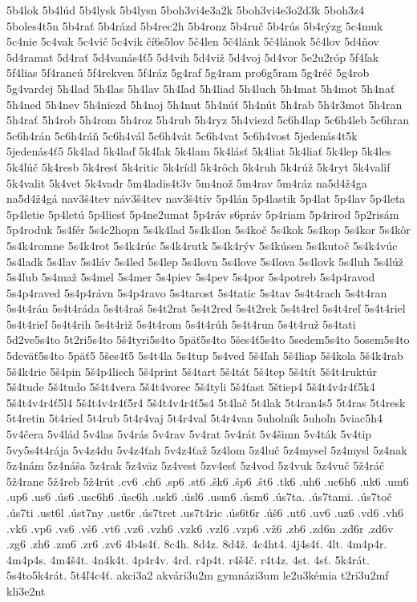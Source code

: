 {5b4lok
5b4lúd
5b4lysk
5b4lysn
5boh3vi4e3a2k
5boh3vi4e3o2d3k
5boh3z4
5boles4t5n
5b4rať
5b4rázd
5b4rec2h
5b4ronz
5b4ruč
5b4rús
5b4rýzg
5c4muk
5c4nie
5c4vak
5c4vič
5c4vik
čí6s5lov
5č4len
5č4lánk
5č4lánok
5č4lov
5d4ňov
5d4ramat
5d4rať
5d4vanás4ť5
5d4vih
5d4viž
5d4voj
5d4vor
5e2u2róp
5f4ľak
5f4lias
5f4rancú
5f4rekven
5f4ráz
5g4raf
5g4ram
pro6g5ram
5g4réč
5g4rob
5g4vardej
5h4lad
5h4las
5h4lav
5h4ľad
5h4liad
5h4luch
5h4mat
5h4mot
5h4nať
5h4ned
5h4nev
5h4niezd
5h4noj
5h4nut
5h4núť
5h4nút
5h4rab
5h4r3mot
5h4ran
5h4rať
5h4rob
5h4rom
5h4roz
5h4rub
5h4ryz
5h4viezd
5c6h4lap
5c6h4leb
5c6hran
5c6h4rán
5c6h4ráň
5c6h4vál
5c6h4vát
5c6h4vat
5c6h4vost
5jedenás4t5k
5jedenás4ť5
5k4lad
5k4laď
5k4ľak
5k4lam
5k4lásť
5k4liat
5k4liať
5k4lep
5k4les
5k4ľúč
5k4resb
5k4resť
5k4ritic
5k4rídl
5k4rôch
5k4ruh
5k4rúž
5k4ryt
5k4valif
5k4valit
5k4vet
5k4vadr
5m4ladis4t3v
5m4nož
5m4rav
5m4ráz
na5d4ž4ga
na5d4ž4gá
nav3š4tev
náv3š4tev
nav3š4tív
5p4lán
5p4lastik
5p4lat
5p4lav
5p4leta
5p4letie
5p4letú
5p4liesť
5p4ne2umat
5p4ráv
s6práv
5p4riam
5p4rirod
5p2risám
5p4roduk
5s4fér
5s4c2hopn
5s4k4lad
5s4k4lon
5s4koč
5s4kok
5s4kop
5s4kor
5s4kôr
5s4k4romne
5s4k4rot
5s4k4rúc
5s4k4rutk
5s4k4rýv
5s4kúsen
5s4kutoč
5s4k4vúc
5s4ladk
5s4lav
5s4láv
5s4led
5s4lep
5s4lovn
5s4love
5s4lova
5s4lovk
5s4luh
5s4lúž
5s4ľub
5s4maž
5s4mel
5s4mer
5s4piev
5s4pev
5s4por
5s4potreb
5s4p4ravod
5s4p4raved
5s4p4rávn
5s4p4ravo
5s4tarost
5s4tatic
5s4tav
5s4t4rach
5s4t4ran
5s4t4rán
5s4t4ráda
5s4t4raš
5s4t2rat
5s4t2red
5s4t2rek
5s4t4rel
5s4t4reľ
5s4t4riel
5s4t4rieľ
5s4t4rih
5s4t4riž
5s4t4rom
5s4t4rúh
5s4t4run
5s4t4ruž
5s4tati
5d2ve5s4to
5t2ri5s4to
5š4tyri5s4to
5päť5s4to
5šes4ť5s4to
5sedem5s4to
5osem5s4to
5deväť5s4to
5päť5
5šes4ť5
5s4t4la
5s4tup
5s4ved
5š4ľah
5š4liap
5š4kola
5š4k4rab
5š4k4rie
5š4pin
5š4p4liech
5š4print
5š4tart
5š4tát
5š4tep
5š4tít
5š4t4ruktúr
5š4tude
5š4tudo
5š4t4vera
5š4t4vorec
5š4tyli
5š4ťast
5štiep4
5š4t4v4r4ť5k4
5š4t4v4r4ť5l4
5š4t4v4r4ť5r4
5š4t4v4r4ť5s4
5t4lač
5t4lak
5t4ran4s5
5t4ras
5t4resk
5t4retin
5t4ried
5t4rub
5t4r4vaj
5t4r4val
5t4r4van
5uholník
5uhoľn
5viac5h4
5v4čera
5v4lád
5v4las
5v4rás
5v4rav
5v4rat
5v4rát
5v4šimn
5v4ták
5v4tip
5vy5s4t4rája
5v4z4du
5v4z4ťah
5v4z4ťaž
5z4lom
5z4luč
5z4mysel
5z4mysl
5z4nak
5z4nám
5z4náša
5z4rak
5z4väz
5z4vest
5zv4esť
5z4vod
5z4vuk
5z4vuč
5ž4ráč
5ž4rane
5ž4reb
5ž4rút
.cv6
.ch6
.sp6
.st6
.šk6
.šp6
.št6
.tk6
.uh6
.uc6h6
.uk6
.um6
.up6
.us6
.ús6
.usc6h6
.úsc6h
.usk6
.úsl6
.usm6
.úsm6
.ús7ta.
.ús7tami.
.ús7toč
.ús7ti
.ust6l
.úst7ny
.ust6r
.ús7tret
.us7t4ric
.ús6t6r
.úš6
.ut6
.uv6
.uz6
.vd6
.vh6
.vk6
.vp6
.vs6
.vš6
.vt6
.vz6
.vzh6
.vzk6
.vzl6
.vzp6
.vž6
.zb6
.zd6n
.zd6r
.zd6v
.zg6
.zh6
.zm6
.zr6
.zv6
4b4s4ť.
8c4h.
8d4z.
8d4ž.
4c4ht4.
4j4s4ť.
4lt.
4m4p4r.
4m4p4s.
4m4š4t.
4n4k4t.
4p4r4v.
4rd.
r4p4t.
r4š4č.
r4t4z.
4st.
4sť.
5k4rát.
5s4to5k4rát.
5t4ľ4c4ť.
akci3a2
akvári3u2m
gymnázi3um
le2u3kémia
t2ri3u2mf
kli3e2nt
}
%
%
